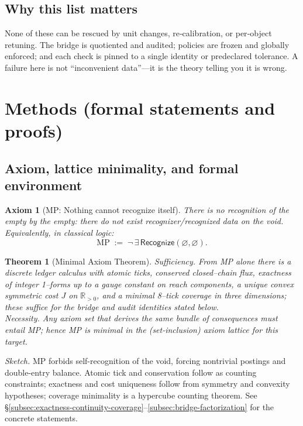 \documentclass[11pt]{article}
\newtheorem{theorem}{Theorem}[section]
\newtheorem{axiom}{Axiom}
\begin{document}
\subsection{Why this list matters}
None of these can be rescued by unit changes, re‑calibration, or per‑object retuning. The bridge is quotiented and audited; policies are frozen and globally enforced; and each check is pinned to a single identity or predeclared tolerance. A failure here is not “inconvenient data”—it is the theory telling you it is wrong.

\section{Methods (formal statements and proofs)}\label{sec:methods}

\subsection{Axiom, lattice minimality, and formal environment}\label{subsec:axiom-minimality}

\begin{axiom}[MP: Nothing cannot recognize itself]\label{ax:MP}
There is no recognition of the empty by the empty: \emph{there do not exist} recognizer/recognized data on the void. Equivalently, in classical logic:
\[
\text{MP} \;:=\; \neg\,\exists\,\mathsf{Recognize}(\varnothing,\varnothing).
\]
\end{axiom}
% 

\begin{theorem}[Minimal Axiom Theorem]\label{thm:MinimalAxiom}
\emph{Sufficiency.} From MP alone there is a discrete ledger calculus with atomic ticks, conserved closed--chain flux, exactness of integer 1--forms up to a gauge constant on reach components, a unique convex symmetric cost $J$ on $\mathbb{R}_{>0}$, and a minimal 8--tick coverage in three dimensions; these suffice for the bridge and audit identities stated below. \\
\emph{Necessity.} Any axiom set that derives the same bundle of consequences must entail MP; hence MP is minimal in the (set-inclusion) axiom lattice for this target.
\end{theorem}
\noindent\emph{Sketch.} MP forbids self-recognition of the void, forcing nontrivial postings and double-entry balance. Atomic tick and conservation follow as counting constraints; exactness and cost uniqueness follow from symmetry and convexity hypotheses; coverage minimality is a hypercube counting theorem. See \S\ref{subsec:exactness-continuity-coverage}--\ref{subsec:bridge-factorization} for the concrete statements.
\end{document}
